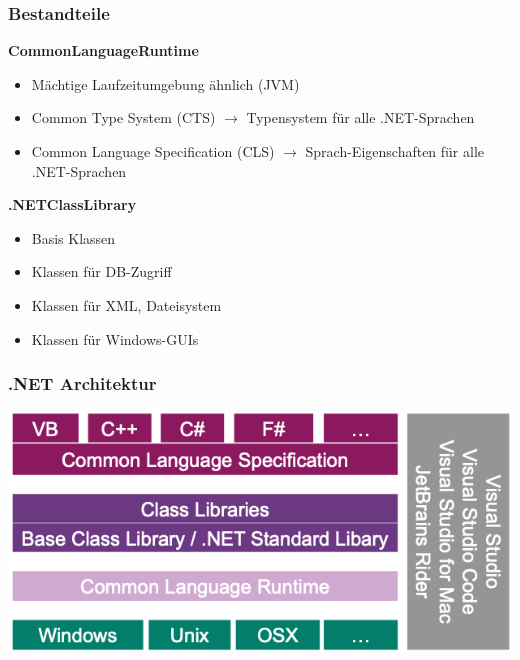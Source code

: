 \subsubsection{Bestandteile}
    \vspace{-10pt}
\begin{multicols}{2}
    \textbf{\textcolor{OSTPink}{CommonLanguageRuntime}}
    \begin{itemize}
        \item Mächtige Laufzeitumgebung ähnlich (JVM)
        \item Common Type System (CTS) $\rightarrow$ Typensystem für alle .NET-Sprachen
        \item Common Language Specification (CLS) $\rightarrow$ Sprach-Eigenschaften für alle .NET-Sprachen
    \end{itemize}

    \columnbreak

    \textbf{\textcolor{OSTPink}{.NETClassLibrary}}

    \begin{itemize}
        \item Basis Klassen
        \item Klassen für DB-Zugriff
        \item Klassen für XML, Dateisystem
        \item Klassen für Windows-GUIs
    \end{itemize}
    \end{multicols}
\vspace{-8pt}
\subsubsection{.NET Architektur}
\begin{center}
    \includegraphics[scale=0.28]{graphic/grundlagen/Grundlagen_dotNET Architektur.png}
\end{center}
\vspace{-8pt}



